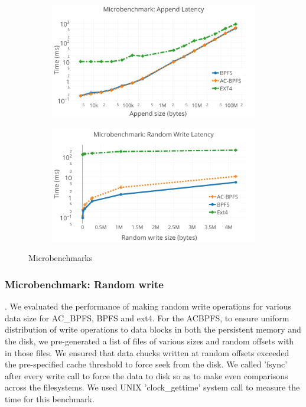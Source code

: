  \begin{figure}[t]\centering
\begin{subfigure}{.46\textwidth}
  \centering
  \includegraphics[width=\linewidth]{figs/append.png}
\end{subfigure}
\begin{subfigure}{.46\textwidth}
  \centering
  \includegraphics[width=\textwidth]{figs/write.png}
\vspace{-0.2in}
\end{subfigure}
\caption{Microbenchmarks}
\label{fig:fig}
\end{figure}

\subsubsection{Microbenchmark: Random write}
. We evaluated the performance of making random write operations for various data size for AC\_BPFS, BPFS and ext4. For the AC\-BPFS, to ensure uniform distribution of write operations to data blocks in both the persistent memory and the disk, we pre-generated a list of files of various sizes and random offsets with in those files. We ensured that data chucks written at random offsets exceeded the pre-specified cache threshold to force seek from the disk. We called 'fsync' after every write call to force the data to disk so as to make even comparisons across the filesystems. We used UNIX 'clock\_gettime' system call to measure the time for this benchmark.

